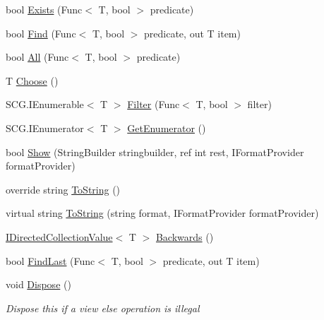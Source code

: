 \begin{DoxyCompactItemize}
bool \hyperlink{class_c5_1_1_wrapped_array_a46a3457811b2f237cbf7ed19d11baa0e}{Exists} (Func$<$ T, bool $>$ predicate)
\item 
bool \hyperlink{class_c5_1_1_wrapped_array_acc9f79f847e3906ccf84a2543090bcb0}{Find} (Func$<$ T, bool $>$ predicate, out T item)
\item 
bool \hyperlink{class_c5_1_1_wrapped_array_a2b0d022ae85980d92ad40df11f59cf7e}{All} (Func$<$ T, bool $>$ predicate)
\item 
T \hyperlink{class_c5_1_1_wrapped_array_ad42ddaec045d78e9d559b12279f7598a}{Choose} ()
\item 
S\+C\+G.\+I\+Enumerable$<$ T $>$ \hyperlink{class_c5_1_1_wrapped_array_a3eee2c5f8d76cd8c3f0d26fa0488fcb7}{Filter} (Func$<$ T, bool $>$ filter)
\item 
S\+C\+G.\+I\+Enumerator$<$ T $>$ \hyperlink{class_c5_1_1_wrapped_array_aa9beb91837122a0eb1efb9efeb5657fd}{Get\+Enumerator} ()
\item 
bool \hyperlink{class_c5_1_1_wrapped_array_a434aab84ad13ca5702baada927f6fcdf}{Show} (String\+Builder stringbuilder, ref int rest, I\+Format\+Provider format\+Provider)
\item 
override string \hyperlink{class_c5_1_1_wrapped_array_a9069735f9eee020d4dece64dc0524bdb}{To\+String} ()
\item 
virtual string \hyperlink{class_c5_1_1_wrapped_array_aa6614dbe6794cf7a814b2d35b3887e32}{To\+String} (string format, I\+Format\+Provider format\+Provider)
\item 
\hyperlink{interface_c5_1_1_i_directed_collection_value}{I\+Directed\+Collection\+Value}$<$ T $>$ \hyperlink{class_c5_1_1_wrapped_array_a2039f22afabd1b152a48ed687dd4e13a}{Backwards} ()
\item 
bool \hyperlink{class_c5_1_1_wrapped_array_a4917a0c9bba4103b8e63df21b3f9804d}{Find\+Last} (Func$<$ T, bool $>$ predicate, out T item)
\item 
void \hyperlink{class_c5_1_1_wrapped_array_a60a1208a6faaa1b0251fbf6b81b876e7}{Dispose} ()
\begin{DoxyCompactList}\small\item\em Dispose this if a view else operation is illegal \end{DoxyCompactList}\end{DoxyCompactItemize}
